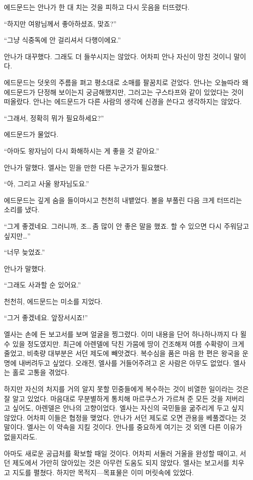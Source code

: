에드문드는 안나가 한 대 치는 것을 피하고 다시 웃음을 터뜨렸다.

``하지만 여왕님께서 좋아하셨죠, 맞죠?''

``그냥 식중독에 안 걸리셔서 다행이에요.''

안나가 대꾸했다. 그래도 더 들쑤시지는 않았다. 어차피 안나 자신이 망친 것이니 말이다.

에드문드는 덧옷의 주름을 펴고 평소대로 소매를 팔꿈치로 걷었다. 안나는 오늘따라 왜 에드문드가 단정해 보이는지 궁금해했지만, 그러고는 구스타프와 같이 있었다는 것이 떠올랐다. 안나는 에드문드가 다른 사람의 생각에 신경을 쓴다고 생각하지는 않았다.

``그래서, 정확히 뭐가 필요하세요?''

에드문드가 물었다.

``아마도 왕자님이 다시 화해하시는 게 좋을 것 같아요.''

안나가 말했다. 엘사는 믿을 만한 다른 누군가가 필요했다.

``아, 그리고 사울 왕자님도요.''

에드문드는 깊게 숨을 들이마시고 천천히 내뱉었다. 볼을 부풀린 다음 크게 터뜨리는 소리를 냈다.

``그게 좋겠네요. 그러니까, 조\ldots\,좀 많이 안 좋은 말을 했죠. 할 수 있으면 다시 주워담고 싶지만\ldots''

``너무 늦었죠.''

안나가 말했다.

``그래도 사과할 순 있어요.''

천천히, 에드문드는 미소를 지었다.

``그거 좋겠네요. 앞장서시죠!''

\textbreak

엘사는 손에 든 보고서를 보며 얼굴을 찡그렸다. 이미 내용을 단어 하나하나까지 다 욀 수 있을 정도였지만. 최근에 아렌델에 닥친 가뭄에 땅이 건조해져 여름 수확량이 크게 줄었고, 비축량 대부분은 서던 제도에 빼앗겼다. 복수심을 품은 마음 한 편은 왕국을 운명에 내버려두고 싶었다. 오래전, 엘사를 거들어주려고 온 사람은 아무도 없었다. 엘사는 홀로 고통을 겪었다.

하지만 자신의 처지를 거의 알지 못할 민중들에게 복수하는 것이 비열한 일이라는 것은 잘 알고 있었다. 마음대로 무분별하게 통치해 마르쿠스가 가르쳐 준 모든 것을 저버리고 싶어도, 아렌델은 안나의 고향이었다. 엘사는 자신의 국민들을 굶주리게 두고 싶지 않았다. 어차피 이들은 협정을 맺었다. 안나가 서던 제도로 오면 관용을 베풀겠다는 것 말이다. 엘사는 이 약속을 지킬 것이다. 안나를 중요하게 여기는 것 외엔 다른 이유가 없을지라도.

아마도 새로운 공급처를 확보할 때일 것이다. 어차피 서둘러 거울을 완성할 때이고, 서던 제도에서 가만히 앉아있는 것은 아무런 도움도 되지 않았다. 엘사는 보고서를 치우고 지도를 펼쳤다. 하지만 목적지—목표물은 이미 머릿속에 있었다.

